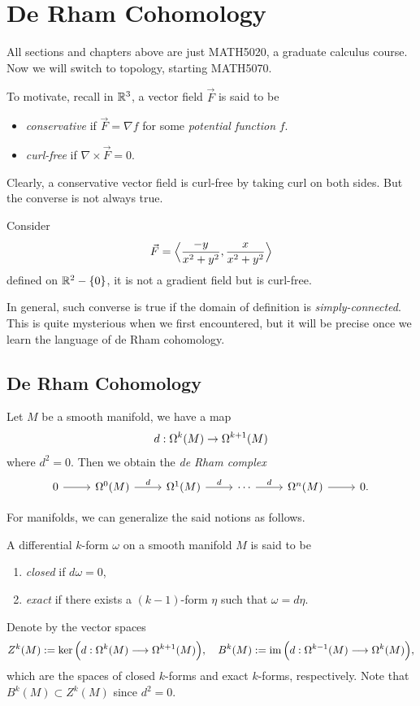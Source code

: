 \chapter{De Rham Cohomology}

All sections and chapters above are just MATH5020, a graduate calculus course. Now we will switch to topology, starting MATH5070.

To motivate, recall in \(\mathbb{R}^3\), a vector field \(\vec{F}\) is said to be \begin{itemize}
    \item \emph{conservative} if \(\vec{F} = \nabla f\) for some \emph{potential function} \(f\).
    \item \emph{curl-free} if \(\nabla\times\vec{F} = 0\).
\end{itemize}
Clearly, a conservative vector field is curl-free by taking curl on both sides. But the converse is not always true.

\begin{example}
    Consider \[
        \vec{F} = \Big\langle\frac{-y}{x^2 + y^2}, \frac{x}{x^2 + y^2}\Big\rangle
    \] defined on \(\mathbb{R}^2\mathbin{-}\{0\}\), it is not a gradient field but is curl-free.
\end{example}

In general, such converse is true if the domain of definition is \emph{simply-connected}. This is quite mysterious when we first encountered, but it will be precise once we learn the language of de Rham cohomology.

\section{De Rham Cohomology}

Let \(M\) be a smooth manifold, we have a map \[
    d:\Omega^k(M)\to\Omega^{k+1}(M)
\] where \(d^2 = 0\).
Then we obtain the \emph{de Rham complex} \[
    \begin{tikzcd}
        0 \ar{r} &\Omg^0(M)
        \ar{r}{d} &\Omg^1(M)
        \ar{r}{d} &\cdots
        \ar{r}{d} &\Omg^n(M) \ar{r} &0.
    \end{tikzcd}
\]

For manifolds, we can generalize the said notions as follows.
\begin{definition}
    A differential \(k\)-form \(\omega\) on a smooth manifold \(M\) is said to be \begin{enumerate}
        \item \emph{closed} if \(d\omega = 0\),
        \item \emph{exact} if there exists a \((k-1)\)-form \(\eta\) such that \(\omega = d\eta\).
    \end{enumerate}
    Denote by the vector spaces \[
        Z^k(M) := \ker\Big(d:\Omega^k(M)\longrightarrow\Omega^{k+1}(M)\Big),\quad
        B^k(M) := \operatorname{im}\Big(d:\Omega^{k-1}(M)\longrightarrow\Omega^k(M)\Big),
    \] which are the spaces of closed \(k\)-forms and exact \(k\)-forms, respectively. Note that \(B^k(M)\subset Z^k(M)\) since \(d^2 = 0\).
\end{definition}

